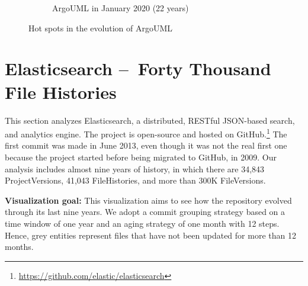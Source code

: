 \begin{figure}[ht]
\begin{subfigure}{0.48\textwidth}
        \caption{ArgoUML in January 2020 (22 years)} 
        \label{fig:ArgoUML_V3_S6}
    \end{subfigure}
    
    \caption{Hot spots in the evolution of ArgoUML} 
    \label{fig:ArgoUML_V3}
\end{figure}
\clearpage

\section{Elasticsearch – Forty Thousand File Histories}
This section analyzes Elasticsearch, a distributed, RESTful JSON-based search, and analytics engine. 
The project is open-source and hosted on GitHub.\footnote{\url{https://github.com/elastic/elasticsearch}}
The first commit was made in June 2013, even though it was not the real first one because the project started before being migrated to GitHub, in 2009.
Our analysis includes almost nine years of history, in which there are 34,843 ProjectVersions, 41,043 FileHistories, and more than 300K FileVersions. 

\bigbreak
\noindent
\textbf{Visualization goal:}
This visualization aims to see how the repository evolved through its last nine years. We adopt a commit grouping strategy based on a time window of one year and an aging strategy of one month with 12 steps. Hence, grey entities represent files that have not been updated for more than 12 months. 


